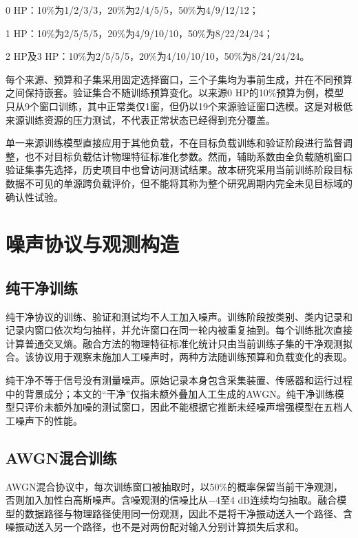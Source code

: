 \documentclass[UTF8,12pt,openany,twoside]{ctexbook}
\numberwithin{equation}{chapter}
\begin{document}
0 HP：10\%为1/2/3/3，20\%为2/4/5/5，50\%为4/9/12/12；

1 HP：10\%为2/5/5/5，20\%为4/9/10/10，50\%为8/22/24/24；

2 HP及3 HP：10\%为2/5/5/5，20\%为4/10/10/10，50\%为8/24/24/24。

每个来源、预算和子集采用固定选择窗口，三个子集均为事前生成，并在不同预算之间保持嵌套。验证集合不随训练预算变化。以来源0 HP的10\%预算为例，模型只从9个窗口训练，其中正常类仅1窗，但仍以19个来源验证窗口选模。这是对极低来源训练资源的压力测试，不代表正常状态已经得到充分覆盖。

单一来源训练模型直接应用于其他负载，不在目标负载训练和验证阶段进行监督调整，也不对目标负载估计物理特征标准化参数。然而，辅助系数由全负载随机窗口验证集事先选择，历史项目中也曾访问测试结果。故本研究采用当前训练阶段目标数据不可见的单源跨负载评价，但不能将其称为整个研究周期内完全未见目标域的确认性试验。

\section{噪声协议与观测构造}\label{ux566aux58f0ux534fux8baeux4e0eux89c2ux6d4bux6784ux9020}

\subsection{纯干净训练}\label{ux7eafux5e72ux51c0ux8badux7ec3}

纯干净协议的训练、验证和测试均不人工加入噪声。训练阶段按类别、类内记录和记录内窗口依次均匀抽样，并允许窗口在同一轮内被重复抽到。每个训练批次直接计算普通交叉熵。融合方法的物理特征标准化统计只由当前训练子集的干净观测拟合。该协议用于观察未施加人工噪声时，两种方法随训练预算和负载变化的表现。

纯干净不等于信号没有测量噪声。原始记录本身包含采集装置、传感器和运行过程中的背景成分；本文的``干净''仅指未额外叠加人工生成的AWGN。纯干净训练模型只评价未额外加噪的测试窗口，因此不能根据它推断未经噪声增强模型在五档人工噪声下的性能。

\subsection{AWGN混合训练}\label{awgnux6df7ux5408ux8badux7ec3}

AWGN混合协议中，每次训练窗口被抽取时，以50\%的概率保留当前干净观测，否则加入加性白高斯噪声。含噪观测的信噪比从−4至4 dB连续均匀抽取。融合模型的数据路径与物理路径使用同一份观测，因此不是将干净振动送入一个路径、含噪振动送入另一个路径，也不是对两份配对输入分别计算损失后求和。
\end{document}
